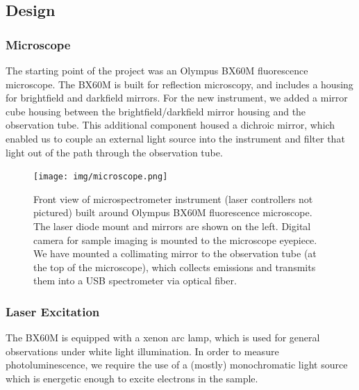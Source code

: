 \subsection{Design}

\subsubsection{Microscope}

The starting point of the project was an Olympus BX60M fluorescence microscope. The BX60M is built for reflection microscopy, and includes a housing for brightfield and darkfield mirrors. For the new instrument, we added a mirror cube housing between the brightfield/darkfield mirror housing and the observation tube. This additional component housed a dichroic mirror, which enabled us to couple an external light source into the instrument and filter that light out of the path through the observation tube.

\begin{figure}[H]
    \centering
    \texttt{[image: img/microscope.png]}
    \caption[Front view of microspectrometer instrument.]{Front view of microspectrometer instrument (laser controllers not pictured) built around Olympus BX60M fluorescence microscope. The laser diode mount and mirrors are shown on the left. Digital camera for sample imaging is mounted to the microscope eyepiece. We have mounted a collimating mirror to the observation tube (at the top of the microscope), which collects emissions and transmits them into a USB spectrometer via optical fiber.}
    \label{img:microscope}
\end{figure}


\subsubsection{Laser Excitation}
The BX60M is equipped with a xenon arc lamp, which is used for general observations under white light illumination. In order to measure photoluminescence, we require the use of a (mostly) monochromatic light source which is energetic enough to excite electrons in the sample.

